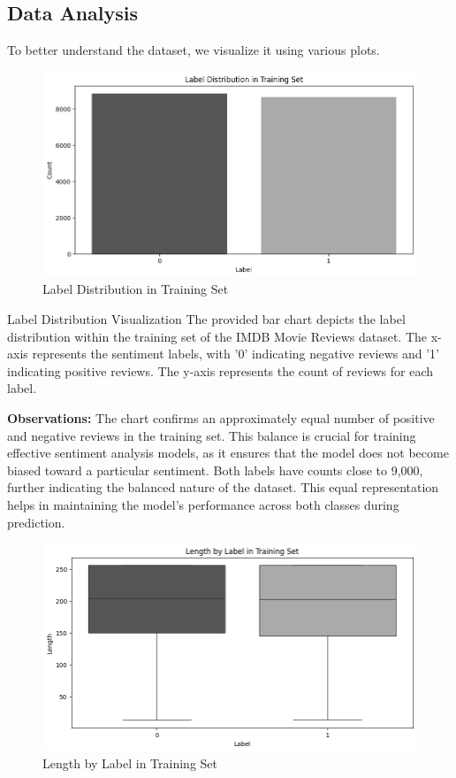 \documentclass{article}
\begin{document}
\subsection{Data Analysis}
To better understand the dataset, we visualize it using various plots.
\begin{figure}[H]
    \centering
    \includegraphics[width=\textwidth]{figs/laybelimdb.png}
    \caption{Label Distribution in Training Set}
    \label{fig:lengthimdb}
\end{figure}
Label Distribution Visualization
The provided bar chart depicts the label distribution within the training set of the IMDB Movie Reviews dataset. The x-axis represents the sentiment labels, with '0' indicating negative reviews and '1' indicating positive reviews. The y-axis represents the count of reviews for each label.

\textbf{Observations:}
The chart confirms an approximately equal number of positive and negative reviews in the training set. This balance is crucial for training effective sentiment analysis models, as it ensures that the model does not become biased toward a particular sentiment.
Both labels have counts close to 9,000, further indicating the balanced nature of the dataset. This equal representation helps in maintaining the model's performance across both classes during prediction.

\begin{figure}[H]
    \centering
    \includegraphics[width=\textwidth]{figs/lengthbylabelimdb.png}
    \caption{Length by Label in Training Set}
    \label{fig:lengthbylabelimdb}
\end{figure}
\end{document}
